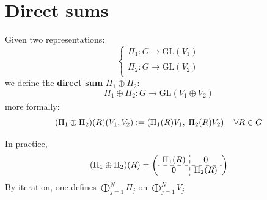 \documentclass[../main.tex]{subfiles}
\begin{document}
\section{Direct sums}
\begin{definition}
Given two representations:
\[
\begin{cases}
\Pi_1:G\xrightarrow[]{}\text{GL}(V_1)\\
\Pi_2:G\xrightarrow[]{}\text{GL}(V_2)
\end{cases}
\]
we define the \textbf{direct sum} {\color{black}$\Pi_1\oplus\Pi_2$}:
\[
\Pi_1\oplus\Pi_2:G\xrightarrow[]{}\text{GL}(V_1\oplus V_2)
\]
more formally:
\[
{\color{black}(\Pi_1\oplus\Pi_2)(R)}(V_1,V_2):=\left({\color{black}\Pi_1(R)}V_1,\;{\color{black}\Pi_2(R)}V_2\right) \quad \forall R\in G
\]
\end{definition}
\begin{kaobox}[frametitle=Remark]
In practice,
\[
(\Pi_1\oplus\Pi_2)(R)=\left(\begin{array}{c:c}
\Pi_1(R) & 0\\
\hdashline
0 & \Pi_2(R)
    \end{array}\right)
\]
By iteration, one defines $\bigoplus_{j=1}^N\Pi_j$ on $\bigoplus_{j=1}^NV_j$
\end{kaobox} 
\end{document}
